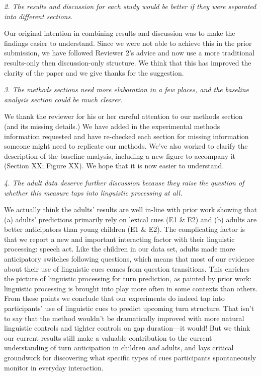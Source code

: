 \documentclass[11pt,a4paper]{letter} %
\begin{document}
\begin{letter}{}
\smallskip

\noindent \textit{2. The results and discussion for each study would be better if they were separated into different sections.}

\noindent Our original intention in combining results and discussion was to make the findings easier to understand. Since we were not able to achieve this in the prior submission, we have followed Reviewer 2's advice and now use a more traditional results-only then discussion-only structure. We think that this has improved the clarity of the paper and we give thanks for the suggestion. 

\smallskip

\noindent \textit{3. The methods sections need more elaboration in a few places, and the baseline analysis section could be much clearer.}

\noindent We thank the reviewer for his or her careful attention to our methods section (and its missing details.) We have added in the experimental methods information requested and have re-checked each section for missing information someone might need to replicate our methods. We've also worked to clarify the description of the baseline analysis, including a new figure to accompany it (Section XX; Figure XX). We hope that it is now easier to understand.

\smallskip

\noindent \textit{4. The adult data deserve further discussion because they raise the question of whether this measure taps into linguistic processing at all.}

\noindent We actually think the adults' results are well in-line with prior work showing that (a) adults' predictions primarily rely on lexical cues (E1 \& E2) and (b) adults are better anticipators than young children (E1 \& E2). The complicating factor is that we report a new and important interacting factor with their linguistic processing: speech act. Like the children in our data set, adults made more anticipatory switches following questions, which means that most of our evidence about their use of linguistic cues comes from question transitions. This enriches the picture of linguistic processing for turn prediction, as painted by prior work: linguistic processing is brought into play more often in some contexts than others. From these points we conclude that our experiments do indeed tap into participants' use of linguistic cues to predict  upcoming turn structure. That isn't to say that the method wouldn't be dramatically improved with more natural linguistic controls and tighter controls on gap duration---it would! But we think our current results still make a valuable contribution to the current understanding of turn anticipation in children \textit{and} adults, and lays critical groundwork for discovering what specific types of cues participants spontaneously monitor in everyday interaction.


\end{letter}
\end{document}
